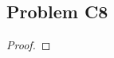 \documentclass[../../../main.tex]{subfiles}
\begin{document}
\subsection{Problem C8}
\begin{wts}

\end{wts}
\begin{proof}

\end{proof}
\end{document}
